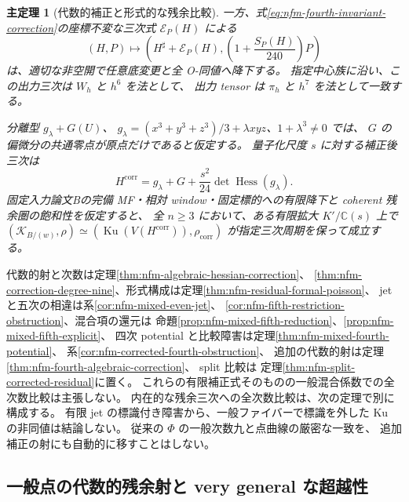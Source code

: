 \documentclass[11pt,a4paper]{ltjsarticle}
\numberwithin{equation}{section}
\newtheorem{maintheorem}{主定理}
\newcommand{\C}{\mathbb C}
\begin{document}
\begin{maintheorem}[代数的補正と形式的な残余比較]
一方、式\eqref{eq:nfm-fourth-invariant-correction}の座標不変な三次式
$\mathcal E_P(H)$ による
\[
 (H,P)\longmapsto
 \left(H^\sharp+\mathcal E_P(H),
       \left(1+\frac{S_P(H)}{240}\right)P\right)
\]
は、適切な非空開で任意底変更と全 O-同値へ降下する。
指定中心族に沿い、この出力三次は $W_h$ と $h^6$ を法として、
出力 tensor は $\pi_h$ と $h^7$ を法として一致する。


分離型 $g_\lambda+G(U)$、
$g_\lambda=(x^3+y^3+z^3)/3+\lambda xyz$、$1+\lambda^3\ne0$ では、
$G$ の偏微分の共通零点が原点だけであると仮定する。
量子化尺度 $s$ に対する補正後三次は
\[
 H^{\mathrm{corr}}=g_\lambda+G+
               \frac{s^2}{24}\det\operatorname{Hess}(g_\lambda).
\]
固定入力論文Bの完備 MF・相対 window・固定標的への有限降下と
coherent 残余圏の飽和性を仮定すると、
全 $n\ge3$ において、ある有限拡大 $K'/\C(s)$ 上で
$(\mathcal K_{B/(w)},\rho)\simeq
(\operatorname{Ku}(V(H^{\mathrm{corr}})),\rho_{\mathrm{corr}})$
が指定三次周期を保って成立する。
\end{maintheorem}

代数的射と次数は定理\ref{thm:nfm-algebraic-hessian-correction}、
\ref{thm:nfm-correction-degree-nine}、形式構成は定理\ref{thm:nfm-residual-formal-poisson}、
jet と五次の相違は系\ref{cor:nfm-mixed-even-jet}、
\ref{cor:nfm-fifth-restriction-obstruction}、混合項の還元は
命題\ref{prop:nfm-mixed-fifth-reduction}、\ref{prop:nfm-mixed-fifth-explicit}、
四次 potential と比較障害は定理\ref{thm:nfm-mixed-fourth-potential}、
系\ref{cor:nfm-corrected-fourth-obstruction}、
追加の代数的射は定理\ref{thm:nfm-fourth-algebraic-correction}、
split 比較は
定理\ref{thm:nfm-split-corrected-residual}に置く。
これらの有限補正式そのものの一般混合係数での全次数比較は主張しない。
内在的な残余三次への全次数比較は、次の定理で別に構成する。
有限 jet の標識付き障害から、一般ファイバーで標識を外した Ku の非同値は結論しない。
従来の $\Phi$ の一般次数九と点曲線の厳密な一致を、
追加補正の射にも自動的に移すことはしない。

\subsection{一般点の代数的残余射と very general な超越性}
\end{document}
